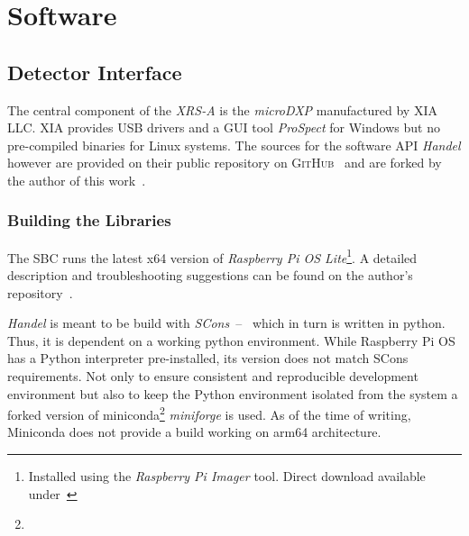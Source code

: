 \chapter{Software}
    \section{Detector Interface}
        The central component of the \textit{XRS-A} is the \textit{microDXP} manufactured by \textsc{XIA LLC}.
        \textsc{XIA} provides USB drivers and a GUI tool \textit{ProSpect} for Windows but no pre-compiled binaries for Linux systems.
        The sources for the software API \textit{Handel} however are provided on their public repository on \textsc{GitHub}~\cite{Software.HandelRelease.2023} and are forked by the author of this work~\cite{Software.XraythesisHandel.2023}.\par\medskip

        \subsection{Building the Libraries}\label{sec:building libraries}
            The SBC runs the latest x64 version of \textit{Raspberry Pi OS Lite}\footnote{Installed using the \textit{Raspberry Pi Imager} tool. Direct download available under~\cite{Software.RaspberryPiOSLite.2023}}.
            A detailed description and troubleshooting suggestions can be found on the author's repository~\cite{Software.XraythesisHandel.2023}.\par\medskip

            \textit{Handel} is meant to be build with \textit{SCons}~--~ which in turn is written in python.
            Thus, it is dependent on a working python environment.
            While Raspberry Pi OS has a Python interpreter pre-installed, its version does not match SCons requirements.
            Not only to ensure consistent and reproducible development environment but also to keep the Python environment isolated from the system a forked version of miniconda\footnote{} \textit{miniforge} is used.
            As of the time of writing, Miniconda does not provide a build working on arm64 architecture.


